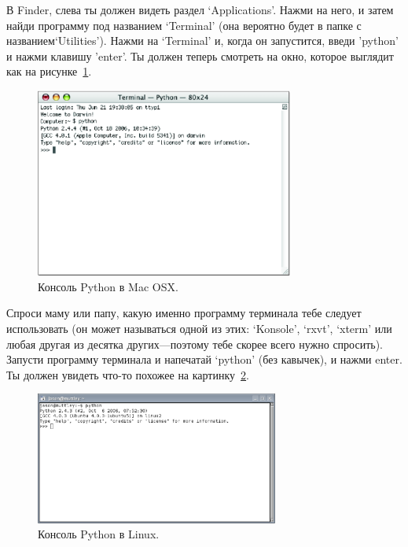 \begin{MAC}
В Finder, слева ты должен видеть раздел `Applications'.  Нажми на него, и затем найди программу под названием `Terminal' (она вероятно будет в папке с названием`Utilities').
Нажми на `Terminal' и, когда он запустится, введи 'python' и нажми клавишу 'enter'.  Ты должен теперь смотреть на окно, которое выглядит как на рисунке~\ref{fig3}.

\begin{figure}
\begin{center}
\includegraphics[width=85mm]{figure3.eps}
\end{center}
\caption{Консоль Python в Mac OSX.}\label{fig3}
\end{figure}
\end{MAC}

\begin{LINUX}
Спроси маму или папу, какую именно программу терминала тебе следует использовать (он может называться одной из этих: `Konsole', `rxvt', `xterm' или любая другая из десятка других---поэтому тебе скорее всего нужно спросить).  Запусти программу терминала и напечатай `python' (без кавычек), и нажми enter.  Ты должен увидеть что-то похожее на картинку~\ref{fig4}.

\begin{figure}
\begin{center}
\includegraphics[width=80mm]{figure4.eps}
\end{center}
\caption{Консоль Python в Linux.}\label{fig4}
\end{figure}
\end{LINUX}

